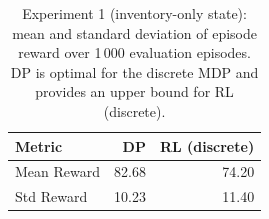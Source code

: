 \begin{table}[h]
\centering
\begin{tabular}{lrr}
\toprule
Metric & DP & RL (discrete) \\
\midrule
Mean Reward & 82.68 & 74.20 \\
Std Reward & 10.23 & 11.40 \\
\bottomrule
\end{tabular}
\caption{Experiment 1 (inventory-only state): mean and standard deviation of episode reward over 1\,000 evaluation episodes. DP is optimal for the discrete MDP and provides an upper bound for RL (discrete).}
\label{tab:exp1}
\end{table}
